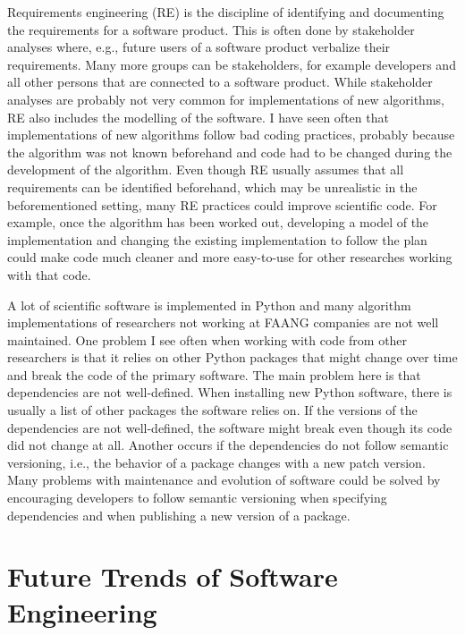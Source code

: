 \documentclass{article}
\begin{document}
    Requirements engineering (RE) is the discipline of identifying and documenting the requirements for a software product.
    This is often done by stakeholder analyses where, e.g., future users of a software product verbalize their requirements.
    Many more groups can be stakeholders, for example developers and all other persons that are connected to a software product.
    While stakeholder analyses are probably not very common for implementations of new algorithms, RE also includes the modelling of the software.
    I have seen often that implementations of new algorithms follow bad coding practices, probably because the algorithm was not known beforehand and code had to be changed during the development of the algorithm.
    Even though RE usually assumes that all requirements can be identified beforehand, which may be unrealistic in the beforementioned setting, many RE practices could improve scientific code.
    For example, once the algorithm has been worked out, developing a model of the implementation and changing the existing implementation to follow the plan could make code much cleaner and more easy-to-use for other researches working with that code.

    A lot of scientific software is implemented in Python and many algorithm implementations of researchers not working at FAANG companies are not well maintained.
    One problem I see often when working with code from other researchers is that it relies on other Python packages that might change over time and break the code of the primary software.
    The main problem here is that dependencies are not well-defined.
    When installing new Python software, there is usually a list of other packages the software relies on.
    If the versions of the dependencies are not well-defined, the software might break even though its code did not change at all.
    Another occurs if the dependencies do not follow semantic versioning, i.e., the behavior of a package changes with a new patch version.
    Many problems with maintenance and evolution of software could be solved by encouraging developers to follow semantic versioning when specifying dependencies and when publishing a new version of a package.
    
    \section{Future Trends of Software Engineering}
\end{document}
